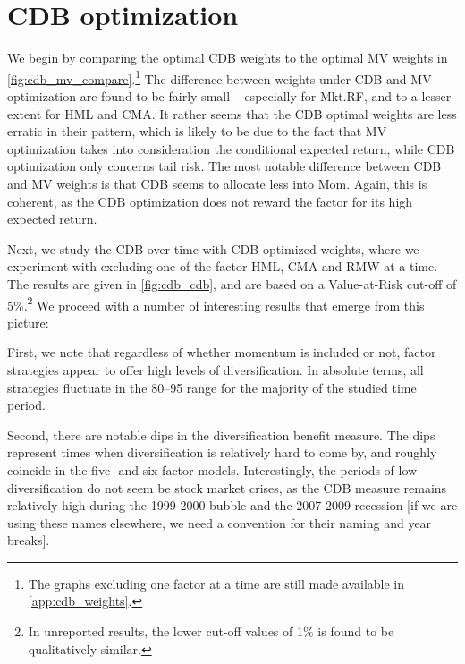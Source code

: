 
\section{CDB optimization} %
\label{sec:cdb_optimization}


We begin by comparing the optimal CDB weights to the optimal MV weights in \autoref{fig:cdb_mv_compare}.\footnote{The graphs excluding one factor at a time are still made available in \autoref{app:cdb_weights}.} The difference between weights under CDB and MV optimization are found to be fairly small -- especially for Mkt.RF, and to a lesser extent for HML and CMA.  It rather seems that the CDB optimal weights are less erratic in their pattern, which is likely to be due to the fact that MV optimization takes into consideration the conditional expected return, while CDB optimization only concerns tail risk. The most notable difference between CDB and MV weights is that CDB seems to allocate less into Mom. Again, this is coherent, as the CDB optimization does not reward the factor for its high expected return. 

Next, we study the CDB over time with CDB optimized weights, where we experiment with excluding one of the factor HML, CMA and RMW at a time. The results are given in \autoref{fig:cdb_cdb}, and are based on a Value-at-Risk cut-off of 5\%.\footnote{In unreported results, the lower cut-off values of 1\% is found to be qualitatively similar.} We proceed with a number of interesting results that emerge from this picture:

First, we note that regardless of whether momentum is included or not, factor strategies appear to offer high levels of diversification. In absolute terms, all strategies fluctuate in the 80--95 range for the majority of the studied time period. 

Second, there are notable dips in the diversification benefit measure. The dips represent times when diversification is relatively hard to come by, and roughly coincide in the five- and six-factor models. Interestingly, the periods of low diversification do not seem be stock market crises, as the CDB measure remains relatively high during the 1999-2000 bubble and the 2007-2009 recession [if we are using these names elsewhere, we need a convention for their naming and year breaks].

